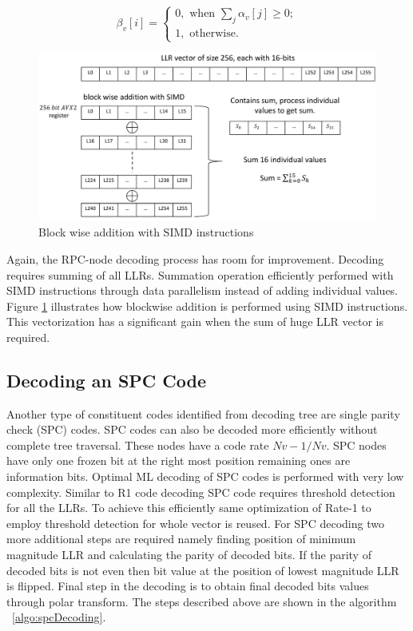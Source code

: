 \begin{equation*}
 \beta_{v}[i] = \begin{cases}
				0, \text{ when $\sum_{j} \alpha_{v}[j] \geq 0 ;$}  \\
				1, \text{ otherwise.}
				\end{cases}
\end{equation*}

\begin{figure}[]
	\centering
	\includegraphics[width=1.0\textwidth]{./figures/SIMD_Addition.pdf}
	\caption{Block wise addition with SIMD instructions}
	\label{fig:SIMDAddition}
\end{figure}

Again, the RPC-node decoding process has room for improvement. Decoding requires summing of all LLRs. Summation operation efficiently performed with SIMD instructions through data parallelism instead of adding individual values. Figure \ref{fig:SIMDAddition} illustrates how blockwise addition is performed using SIMD instructions. This vectorization has a significant gain when the sum of huge LLR vector is required.

\subsection{Decoding an SPC Code}
Another type of constituent codes identified from decoding tree are single parity check (SPC) codes. SPC codes can also be decoded more efficiently without complete tree traversal. These nodes have a code rate $Nv-1/Nv$. SPC nodes have only one frozen bit at the right most position remaining ones are information bits. Optimal ML decoding of SPC codes is performed with very low complexity. Similar to R1 code decoding SPC code requires threshold detection for all the LLRs. To achieve this efficiently same optimization of Rate-1 to employ threshold detection for whole vector is reused. For SPC decoding two more additional steps are required namely finding position of minimum magnitude LLR and calculating the parity of decoded bits. If the parity of decoded bits is not even then bit value at the position of lowest magnitude LLR is flipped. Final step in the decoding is to obtain final decoded bits values through polar transform. The steps described above are shown in the algorithm ~\ref{algo:spcDecoding}.

